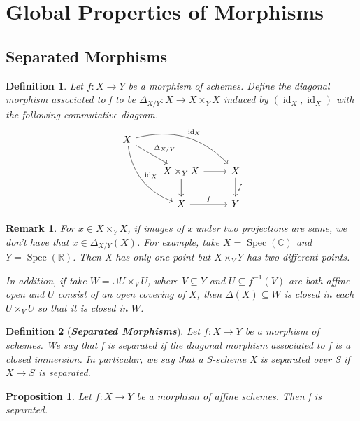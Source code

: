 \documentclass{ctexart}
\newtheorem{definition}{Definition}[section]
\newtheorem{remark}{Remark}[section]
\newtheorem{proposition}{Proposition}[section]
\newcommand{\identity}{\operatorname{id}}
\newcommand{\spec}{\operatorname{Spec}}
\begin{document}
\section{Global Properties of Morphisms}
\label{section:Global Properties of Morphisms}

\subsection{Separated Morphisms}
\begin{definition}
    Let $f: X \longrightarrow Y$ be a morphism of schemes.
    Define the diagonal morphism associated to f to be $\Delta_{X/Y}: X \longrightarrow X \times_{Y} X$ induced by $(\identity_{X}, \identity_{X})$ with the following commutative diagram.
    \begin{equation*}
        \begin{tikzcd}
            X \arrow[drr, "\identity_{X}", bend left] \arrow[dr, "\Delta_{X/Y}"] \arrow[ddr, "\identity_{X}", bend right] && \\
            & X \times_{Y} X \arrow[r] \arrow[d] & 
            X \arrow[d, "f"] \\
            & X \arrow[r, "f"] &
            Y
        \end{tikzcd}
    \end{equation*}
\end{definition}
\begin{remark}
    For $x\in X \times_{Y} X$, if images of x under two projections are same, we don't have that $x\in \Delta_{X/Y}(X)$.
    For example, take $X = \spec(\mathbb{C})$ and $Y = \spec(\mathbb{R})$.
    Then X has only one point but $X \times_{Y} Y$ has two different points.
    \par
    In addition, if take $W = \cup U \times_{V} U$, where $V \subseteq Y$ and $U \subseteq f^{-1}(V)$ are both affine open and $U$ consist of an open covering of $X$,
    then $\Delta(X) \subseteq W$ is closed in each $U \times_{V} U$ so that it is closed in $W$.
\end{remark}
\begin{definition}[\textbf{\emph{Separated Morphisms}}]
    Let $f: X \longrightarrow Y$ be a morphism of schemes.
    We say that f is separated if the diagonal morphism associated to f is a closed immersion.
    In particular, we say that a S-scheme X is separated over S if $X \longrightarrow S$ is separated.
\end{definition}
\begin{proposition}
    Let $f: X \longrightarrow Y$ be a morphism of affine schemes.
    Then f is separated.
    \label{Proposition 4.1}
\end{proposition}
\end{document}
